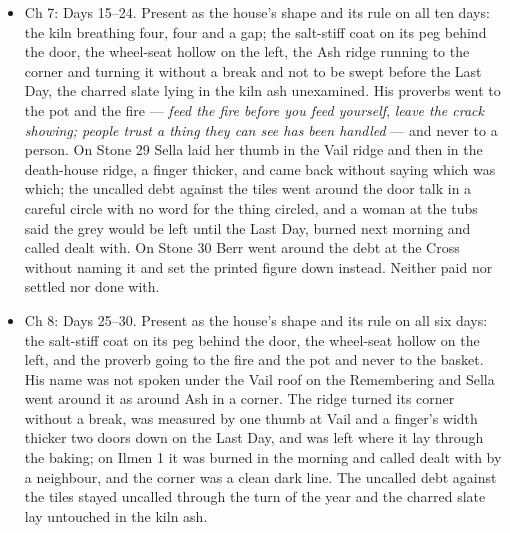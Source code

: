 \documentclass{design/chronicle}
\begin{document}
{\begin{itemize}[leftmargin=1.4em,itemsep=1pt,topsep=3pt,parsep=0pt]
\end{itemize}

\begin{itemize}[leftmargin=1.4em,itemsep=1pt,topsep=3pt,parsep=0pt]

\item Ch 7: Days 15--24. Present as the house’s shape and its rule on all ten days: the kiln breathing four, four and a gap; the salt-stiff coat on its peg behind the door, the wheel-seat hollow on the left, the Ash ridge running to the corner and turning it without a break and not to be swept before the Last Day, the charred slate lying in the kiln ash unexamined. His proverbs went to the pot and the fire --- \emph{feed the fire before you feed yourself}, \emph{leave the crack showing; people trust a thing they can see has been handled} --- and never to a person. On Stone 29 Sella laid her thumb in the Vail ridge and then in the death-house ridge, a finger thicker, and came back without saying which was which; the uncalled debt against the tiles went around the door talk in a careful circle with no word for the thing circled, and a woman at the tubs said the grey would be left until the Last Day, burned next morning and called dealt with. On Stone 30 Berr went around the debt at the Cross without naming it and set the printed figure down instead. Neither paid nor settled nor done with.

\end{itemize}

\begin{itemize}[leftmargin=1.4em,itemsep=1pt,topsep=3pt,parsep=0pt]

\item Ch 8: Days 25--30. Present as the house’s shape and its rule on all six days: the salt-stiff coat on its peg behind the door, the wheel-seat hollow on the left, and the proverb going to the fire and the pot and never to the basket. His name was not spoken under the Vail roof on the Remembering and Sella went around it as around Ash in a corner. The ridge turned its corner without a break, was measured by one thumb at Vail and a finger’s width thicker two doors down on the Last Day, and was left where it lay through the baking; on Ilmen 1 it was burned in the morning and called dealt with by a neighbour, and the corner was a clean dark line. The uncalled debt against the tiles stayed uncalled through the turn of the year and the charred slate lay untouched in the kiln ash.

\end{itemize}

}
\end{document}
